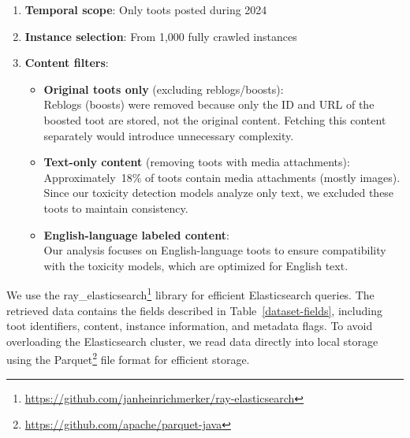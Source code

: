 \begin{enumerate}
    \item \textbf{Temporal scope}: Only toots posted during 2024
    \item \textbf{Instance selection}: From 1,000 fully crawled instances
    \item \textbf{Content filters}:
    \begin{itemize}
        \item \textbf{Original toots only} (excluding reblogs/boosts): \\
        Reblogs (boosts) were removed because only the ID and URL of the boosted toot are stored, not the original content. Fetching this content separately would introduce unnecessary complexity.
        
        \item \textbf{Text-only content} (removing toots with media attachments): \\ 
        Approximately~18\% of toots contain media attachments (mostly images). Since our toxicity detection models analyze only text, we excluded these toots to maintain consistency.
        
        \item \textbf{English-language labeled content}: \\
        Our analysis focuses on English-language toots to ensure compatibility with the toxicity models, which are optimized for English text.
    \end{itemize}
\end{enumerate}

We use the ray\_elasticsearch\footnote{\url{https://github.com/janheinrichmerker/ray-elasticsearch}} library for efficient Elasticsearch queries. The retrieved data contains the fields described in Table~\ref{dataset-fields}, including toot identifiers, content, instance information, and metadata flags. To avoid overloading the Elasticsearch cluster, we read data directly into local storage using the Parquet\footnote{\url{https://github.com/apache/parquet-java}} file format for efficient storage.

